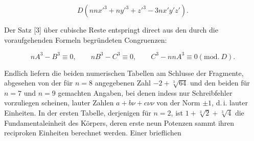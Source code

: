\[
D(nnx'^3+ny'^3+z'^3-3nx'y'z').
\]

Der Satz [3] über cubische Reste entspringt direct aus den durch die
voraufgehenden Formeln begründeten Congruenzen:

\[
nA^3-B^3 \equiv 0, \qquad nB^3-C^3 \equiv 0, \qquad C^3-nnA^3 \equiv 0 (\mathrm{mod.}\ D).
\]

Endlich liefern die beiden numerischen Tabellen am Schlusse der Fragmente,
abgesehen von der für $n=8$ angegebenen Zahl $-2+\sqrt[3]{64}$ und den beiden
für $n=7$ und $n=9$ gemachten Angaben, bei denen indess nur Schreibfehler
vorzuliegen scheinen, lauter Zahlen $a+b\nu+c\nu\nu$ von der Norm $\pm 1$,
d.\,i. lauter Einheiten. In der ersten Tabelle, derjenigen für $n=2$, ist
$1+\sqrt[3]{2}+\sqrt[3]{4}$ die Fundamentaleinheit des Körpers, deren erste
neun Potenzen sammt ihren reciproken Einheiten berechnet werden. Einer
brieflichen%
